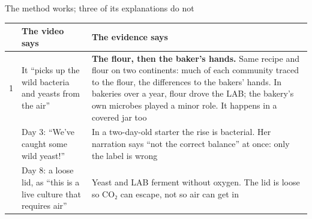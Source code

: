 \documentclass[aspectratio=169,11pt]{beamer}
\begin{document}
\begin{frame}{The method works; three of its explanations do not}
  \footnotesize
  \begin{tabularx}{\linewidth}{@{}c >{\raggedright\arraybackslash}p{3.9cm} X@{}}
    \toprule
    & \textbf{The video says} & \textbf{The evidence says} \\
    \midrule
    1 & It ``picks up the wild bacteria and yeasts from the air'' &
      \textbf{The flour, then the baker's hands.} Same recipe and flour on two continents: much of each community traced to the flour, the differences to the bakers' hands. In bakeries over a year, flour drove the LAB; the bakery's own microbes played a minor role. It happens in a covered jar too \\
    \addlinespace
    2 & Day 3: ``We've caught some wild yeast!'' &
      In a two-day-old starter the rise is bacterial. Her narration says ``not the correct balance'' at once: only the label is wrong \\
    \addlinespace
    3 & Day 8: a loose lid, as ``this is a live culture that requires air'' &
      Yeast and LAB ferment without oxygen. The lid is loose so CO₂ can escape, not so air can get in \\
    \bottomrule
  \end{tabularx}
\end{frame}
\end{document}
